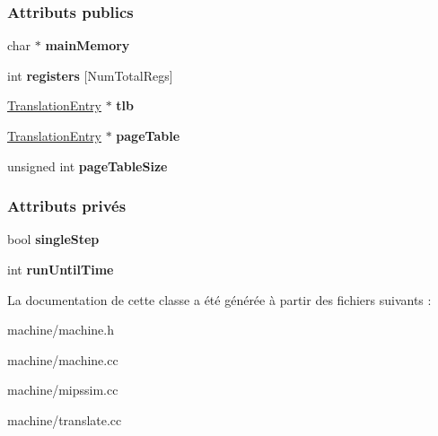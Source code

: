\subsubsection*{Attributs publics}
\begin{DoxyCompactItemize}
\item 
\hypertarget{class_machine_aa2ad571478bcc8aa88cebe50fc533ec7}{}\label{class_machine_aa2ad571478bcc8aa88cebe50fc533ec7} 
char $\ast$ {\bfseries main\+Memory}
\item 
\hypertarget{class_machine_a97712e3db6165648d169598fdf26b756}{}\label{class_machine_a97712e3db6165648d169598fdf26b756} 
int {\bfseries registers} \mbox{[}Num\+Total\+Regs\mbox{]}
\item 
\hypertarget{class_machine_a900108b92c72cfbcab9106d99be5a315}{}\label{class_machine_a900108b92c72cfbcab9106d99be5a315} 
\hyperlink{class_translation_entry}{Translation\+Entry} $\ast$ {\bfseries tlb}
\item 
\hypertarget{class_machine_a9e4092e3d7bab29b7d1f54ad005527ca}{}\label{class_machine_a9e4092e3d7bab29b7d1f54ad005527ca} 
\hyperlink{class_translation_entry}{Translation\+Entry} $\ast$ {\bfseries page\+Table}
\item 
\hypertarget{class_machine_a439af96b1d906dbea5dfb538d8491418}{}\label{class_machine_a439af96b1d906dbea5dfb538d8491418} 
unsigned int {\bfseries page\+Table\+Size}
\end{DoxyCompactItemize}
\subsubsection*{Attributs privés}
\begin{DoxyCompactItemize}
\item 
\hypertarget{class_machine_a35987664b2f92fd54172966e3383d8be}{}\label{class_machine_a35987664b2f92fd54172966e3383d8be} 
bool {\bfseries single\+Step}
\item 
\hypertarget{class_machine_a7062f57475fe22387f85013049fd61d4}{}\label{class_machine_a7062f57475fe22387f85013049fd61d4} 
int {\bfseries run\+Until\+Time}
\end{DoxyCompactItemize}


La documentation de cette classe a été générée à partir des fichiers suivants \+:\begin{DoxyCompactItemize}
\item 
machine/machine.\+h\item 
machine/machine.\+cc\item 
machine/mipssim.\+cc\item 
machine/translate.\+cc\end{DoxyCompactItemize}
